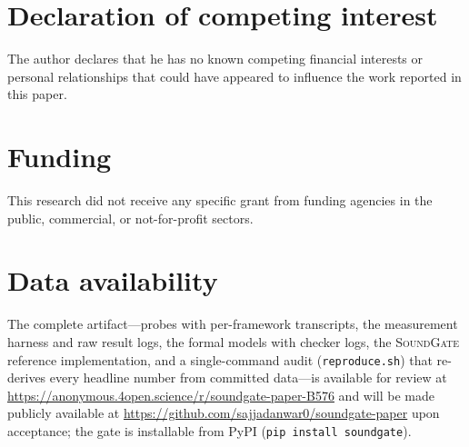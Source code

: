 \documentclass[10pt,journal,compsoc]{IEEEtran}
\newcommand{\sys}{\textsc{SoundGate}}
\begin{document}
\section*{Declaration of competing interest}
The author declares that he has no known competing financial interests or
personal relationships that could have appeared to influence the work
reported in this paper.

\section*{Funding}
This research did not receive any specific grant from funding agencies in the
public, commercial, or not-for-profit sectors.

\section*{Data availability}
The complete artifact---probes with per-framework transcripts, the
measurement harness and raw result logs, the formal models with checker
logs, the \sys{} reference implementation, and a single-command audit
(\texttt{reproduce.sh}) that re-derives every headline number from committed
data---is available for review at
\url{https://anonymous.4open.science/r/soundgate-paper-B576} and will be made
publicly available at \url{https://github.com/sajjadanwar0/soundgate-paper}
upon acceptance; the gate is
installable from PyPI (\texttt{pip install soundgate}).
\end{document}
